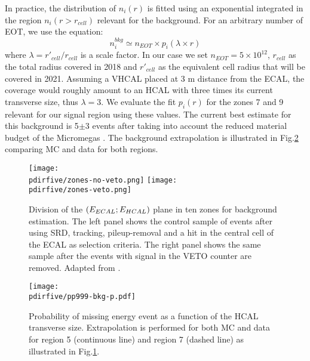 In practice, the distribution of $n_{i}(r)$ is fitted using an exponential integrated in the region $n_i(r>r_{cell})$ relevant for the background. For an arbitrary number of EOT, we use the equation:
\begin{equation}
  \label{eq:exp-bkg-inv-2021}
  n^{bkg}_i \simeq n_{EOT} \times p_i(\lambda \times r)
\end{equation}
where $\lambda = r'_{cell}/r_{cell}$ is a scale factor. In our case we set $n_{EOT} = 5 \times 10^{12}$, $r_{cell}$ as the total radius covered in 2018 and $r'_{cell}$ as the equivalent cell radius that will be covered in 2021. Assuming a VHCAL placed at 3 \si{\meter} distance from the ECAL, the coverage would roughly amount to an HCAL with three times its current transverse size, thus $\lambda = 3$. We evaluate the fit $p_i(r)$ for the zones 7 and 9 relevant for our signal region using these values. The current best estimate for this background is 5$\pm$3 events after taking into account the reduced material budget of the Micromegas \cite{pdegen-thesis}. The background extrapolation is illustrated in Fig.\ref{fig:enucl-bkg-extrapolation} comparing MC and data for both regions.


\begin{figure}[tbh!]
  \centering
  \texttt{[image: \\pdirfive/zones-no-veto.png]}
  \texttt{[image: \\pdirfive/zones-veto.png]}
  \caption[Electro-nuclear background estimation]{Division of the $(E_{ECAL};E_{HCAL})$ plane in ten zones for background estimation. The left panel shows the control sample of events after using SRD, tracking, pileup-removal and a hit in the central cell of the ECAL as selection criteria. The right panel shows the same sample after the events with signal in the VETO counter are removed. Adapted from \cite{na64-neutrals-study}.}
  \label{fig:enucl-bkg-estimation}
\end{figure}

\begin{figure}[bth!]
  \centering
  \texttt{[image: \\pdirfive/pp999-bkg-p.pdf]}
  \caption[Background extrapolation invisible mode]{Probability of missing energy event as a function of the HCAL transverse size. Extrapolation is performed for both MC and data for region 5 (continuous line) and region 7 (dashed line) as illustrated in Fig.\ref{fig:enucl-bkg-estimation}.}
  \label{fig:enucl-bkg-extrapolation}
\end{figure}

\clearpage

